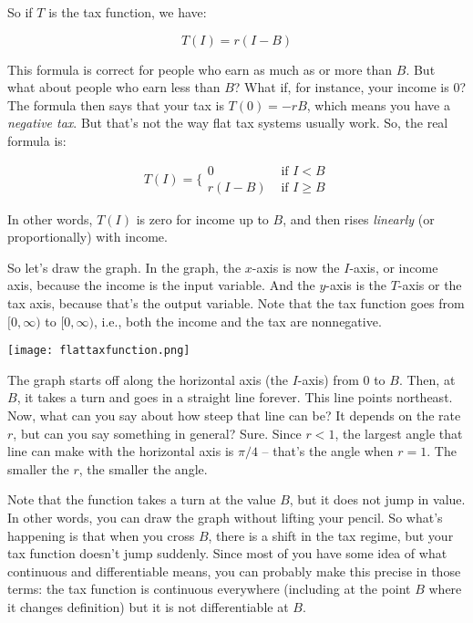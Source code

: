 \documentclass{amsart}
\begin{document}
So if $T$ is the tax function, we have:

\begin{equation*}
  T(I) = r(I - B)
\end{equation*}

This formula is correct for people who earn as much as or more than
$B$. But what about people who earn less than $B$? What if, for
instance, your income is $0$? The formula then says that your tax is
$T(0) = -rB$, which means you have a {\em negative tax}. But that's
not the way flat tax systems usually work. So, the real formula is:

\begin{equation*}
  T(I) = \lbrace \begin{array}{lr}
               0 &\text{ if } I < B \\
	       r(I - B) &\text{ if } I \ge B
	       \end{array}
\end{equation*}

In other words, $T(I)$ is zero for income up to $B$, and then rises
{\em linearly} (or proportionally) with income.

So let's draw the graph. In the graph, the $x$-axis is now the
$I$-axis, or income axis, because the income is the input
variable. And the $y$-axis is the $T$-axis or the tax axis, because
that's the output variable. Note that the tax function goes from
$[0,\infty)$ to $[0,\infty)$, i.e., both the income and the tax are
nonnegative.

\texttt{[image: flattaxfunction.png]}

The graph starts off along the horizontal axis (the $I$-axis) from $0$
to $B$. Then, at $B$, it takes a turn and goes in a straight line
forever. This line points northeast. Now, what can you say about how
steep that line can be? It depends on the rate $r$, but can you say
something in general? Sure. Since $r < 1$, the largest angle that line
can make with the horizontal axis is $\pi/4$ -- that's the angle when
$r = 1$. The smaller the $r$, the smaller the angle.

Note that the function takes a turn at the value $B$, but it does not
jump in value. In other words, you can draw the graph without lifting
your pencil. So what's happening is that when you cross $B$, there is
a shift in the tax regime, but your tax function doesn't jump
suddenly. Since most of you have some idea of what continuous and
differentiable means, you can probably make this precise in those
terms: the tax function is continuous everywhere (including at the
point $B$ where it changes definition) but it is not differentiable at
$B$.
\end{document}
